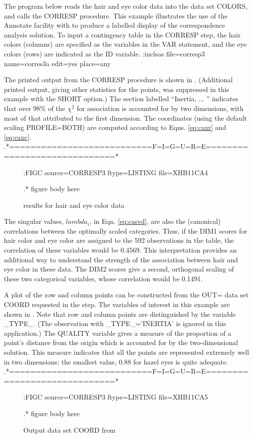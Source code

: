 The program below reads the hair and eye color data into the data set
COLORS, and calls the CORRESP procedure.
This example illustrates the use of the Annotate facility with
 to produce a labelled display of the correspondence analysis solution.
To input a contingency table in the CORRESP step,
the hair colors (columns) are specified as the variables in the
VAR statement, and the eye colors (rows)
are indicated as the ID variable.
:inclsas file=corresp3 name=corres3a edit=yes place=any

The printed output from the CORRESP procedure
is shown in .
(Additional printed output, giving
other statistics for the points, was suppressed in this
example with the SHORT option.)
The section labelled ``Inertia, ... '' indicates that
over 98\% of the \(\chi^2\) for
association is accounted for by two dimensions, with
most of that attributed to the first dimension.
The coordinates (using the default scaling PROFILE=BOTH)
are computed according to Eqns.
\eqref{eq:caxr} and \eqref{eq:caxc}.
.*===========================F=I=G=U=R=E=============================*
\begin{figure}\label{ca4}
:FIGC source=CORRESP3 ftype=LISTING file=XHB11CA4

.* figure body here
\caption{ results for hair and eye color data}
\end{figure}


The singular values, \(lambda_{i}\), in Eqn.
\eqref{eq:casvd},
are also the (canonical) correlations between the optimally
scaled categories.
Thus, if the DIM1 scores for hair color and eye color are assigned to the
592 observations in the table, the correlation of these variables
would be 0.4569.
This interpretation provides an additional way to understand the
strength of the association between hair and eye color in these data.
The DIM2 scores give a second,
orthogonal scaling of these two categorical
variables, whose correlation would be 0.1491.

A plot of the row and column points can be constructed from
the OUT= data set COORD requested in the  step.
The variables of interest in this example are shown in
.
Note that row and column points are distinguished by the
variable _TYPE_.
(The observation with _TYPE_='INERTIA' is ignored in this
application.)
The QUALITY variable gives a measure of the proportion of a point's
distance from the origin which is accounted for by the two-dimensional
solution.
This measure indicates that all the points are represented
extremely well in two dimensions; the smallest value, 0.88 for
hazel eyes is quite adequate.
.*===========================F=I=G=U=R=E=============================*
\begin{figure}\label{ca5}
:FIGC source=CORRESP3 ftype=LISTING file=XHB11CA5

.* figure body here
\caption{Output data set COORD from }
\end{figure}


